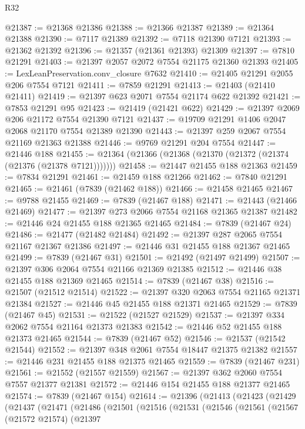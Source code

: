 \begin{lexlean}{R32}
\begin{coremodule}
@21387 := @21368 @21386
@21388 := @21366 @21387
@21389 := @21364 @21388
@21390 := @7117 @21389
@21392 := @7118 @21390 @7121
@21393 := @21362 @21392
@21396 := @21357 (@21361 @21393) @21309
@21397 := @7810 @21291
@21403 := @21397 @2057 @2072 @7554 @21175 @21360 @21393
@21405 := LexLeanPreservation.conv_closure @7632
@21410 := @21405 @21291 @2055 @206 @7554 @7121
@21411 := @7859 @21291
@21413 := @21403 (@21410 @21411)
@21419 := @21397 @623 @2071 @7554 @21174 @622 @21392
@21421 := @7853 @21291 @95
@21423 := @21419 (@21421 @622)
@21429 := @21397 @2069 @206 @21172 @7554 @21390 @7121
@21437 := @19709 @21291 @1406 @2047 @2068 @21170 @7554 @21389 @21390
@21443 := @21397 @259 @2067 @7554 @21169 @21363 @21388
@21446 := @9769 @21291 @204 @7554
@21447 := @21446 @188
@21455 := @21364 (@21366 (@21368 (@21370 (@21372 (@21374 (@21376 (@21378 @7121)))))))
@21458 := @21447 @21455 @188 @21363
@21459 := @7834 @21291
@21461 := @21459 @188 @21266
@21462 := @7840 @21291
@21465 := @21461 (@7839 (@21462 @188))
@21466 := @21458 @21465
@21467 := @9788 @21455
@21469 := @7839 (@21467 @188)
@21471 := @21443 (@21466 @21469)
@21477 := @21397 @273 @2066 @7554 @21168 @21365 @21387
@21482 := @21446 @24 @21455 @188 @21365 @21465
@21484 := @7839 (@21467 @24)
@21486 := @21477 (@21482 @21484)
@21492 := @21397 @287 @2065 @7554 @21167 @21367 @21386
@21497 := @21446 @31 @21455 @188 @21367 @21465
@21499 := @7839 (@21467 @31)
@21501 := @21492 (@21497 @21499)
@21507 := @21397 @306 @2064 @7554 @21166 @21369 @21385
@21512 := @21446 @38 @21455 @188 @21369 @21465
@21514 := @7839 (@21467 @38)
@21516 := @21507 (@21512 @21514)
@21522 := @21397 @320 @2063 @7554 @21165 @21371 @21384
@21527 := @21446 @45 @21455 @188 @21371 @21465
@21529 := @7839 (@21467 @45)
@21531 := @21522 (@21527 @21529)
@21537 := @21397 @334 @2062 @7554 @21164 @21373 @21383
@21542 := @21446 @52 @21455 @188 @21373 @21465
@21544 := @7839 (@21467 @52)
@21546 := @21537 (@21542 @21544)
@21552 := @21397 @348 @2061 @7554 @18447 @21375 @21382
@21557 := @21446 @231 @21455 @188 @21375 @21465
@21559 := @7839 (@21467 @231)
@21561 := @21552 (@21557 @21559)
@21567 := @21397 @362 @2060 @7554 @7557 @21377 @21381
@21572 := @21446 @154 @21455 @188 @21377 @21465
@21574 := @7839 (@21467 @154)
@21614 := @21396
    (@21413
      (@21423
        (@21429
          (@21437
            (@21471
              (@21486
                (@21501
                  (@21516
                    (@21531
                      (@21546
                        (@21561
                          (@21567
                            (@21572 @21574)
                            (@21397

\end{coremodule}
\end{lexlean}
